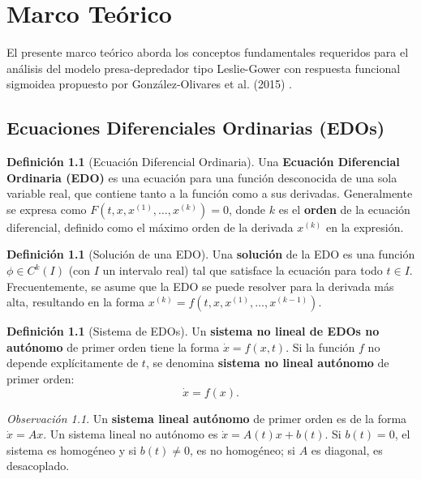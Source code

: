 \documentclass[12pt,letterpaper,oneside]{book}
\theoremstyle{definition}
\newtheorem{definicion}[teorema]{Definición}
\theoremstyle{remark}
\newtheorem{observacion}[teorema]{Observación}
\begin{document}
	\chapter{Marco Teórico}
	
	El presente marco teórico aborda los conceptos fundamentales requeridos para el análisis del modelo presa-depredador tipo Leslie-Gower con respuesta funcional sigmoidea propuesto por González-Olivares et al. (2015) \cite{articulo}.
	
	\section{Ecuaciones Diferenciales Ordinarias (EDOs)}
	
	\begin{definicion}[Ecuación Diferencial Ordinaria]
		Una \textbf{Ecuación Diferencial Ordinaria (EDO)} es una ecuación para una función desconocida de una sola variable real, que contiene tanto a la función como a sus derivadas. Generalmente se expresa como $F(t, x, x^{(1)}, \ldots, x^{(k)}) = 0$, donde $k$ es el \textbf{orden} de la ecuación diferencial, definido como el máximo orden de la derivada $x^{(k)}$ en la expresión.
	\end{definicion}
	
	\begin{definicion}[Solución de una EDO]
		Una \textbf{solución} de la EDO es una función $\phi \in C^k(I)$ (con $I$ un intervalo real) tal que satisface la ecuación para todo $t \in I$. Frecuentemente, se asume que la EDO se puede resolver para la derivada más alta, resultando en la forma $x^{(k)} = f(t, x, x^{(1)}, \ldots, x^{(k-1)})$.
	\end{definicion}
	
	\begin{definicion}[Sistema de EDOs]
		Un \textbf{sistema no lineal de EDOs no autónomo} de primer orden tiene la forma $\dot{x} = f(x, t)$. Si la función $f$ no depende explícitamente de $t$, se denomina \textbf{sistema no lineal autónomo} de primer orden: 
		\begin{equation}
			\dot{x} = f(x).
			\label{eq: sistema}
		\end{equation}
	\end{definicion}
	
	\begin{observacion}
		Un \textbf{sistema lineal autónomo} de primer orden es de la forma $\dot{x} = Ax$. Un sistema lineal no autónomo es $\dot{x} = A(t)x + b(t)$. Si $b(t) = 0$, el sistema es homogéneo y si $b(t) \neq 0$, es no homogéneo; si $A$ es diagonal, es desacoplado.
	\end{observacion}
	
\end{document}
